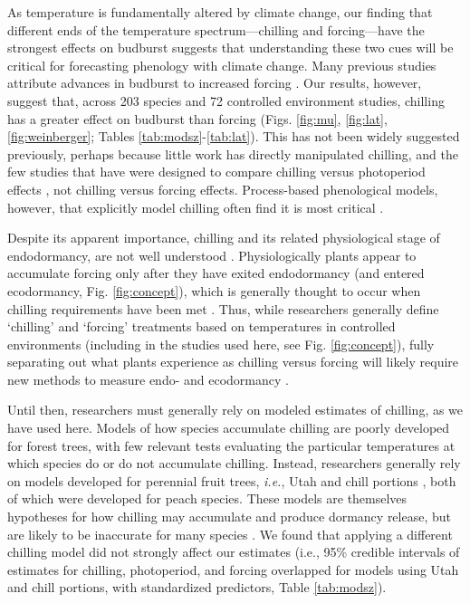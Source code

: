 \documentclass{article}
\begin{document}
\par As temperature is fundamentally altered by climate change, our finding that different ends of the temperature spectrum---chilling and forcing---have the strongest effects on budburst suggests that understanding these two cues will be critical for forecasting phenology with climate change. Many previous studies attribute advances in budburst to increased forcing \emph{\citep{menzel2006,harrington2015,Basler:2014aa,bradley1999}}. Our results, however, suggest that, across 203 species and 72 controlled environment studies, chilling has a greater effect on budburst than forcing (Figs. \ref{fig:mu}, \ref{fig:lat}, \ref{fig:weinberger}; Tables \ref{tab:modsz}-\ref{tab:lat}). This has not been widely suggested previously, perhaps because little work has directly manipulated chilling, and the few studies that have were designed to compare chilling versus photoperiod effects \emph{\citep[e.g.,][]{zohner2016,Basler:2014aa,Caffarra:2011qf,Laube:2014a}}, not chilling versus forcing effects. Process-based phenological models, however, that explicitly model chilling often find it is most critical \emph{\citep[e.g.,][]{gauzere2019}}. 
\par Despite its apparent importance, chilling and its related physiological stage of endodormancy, are not well understood \emph{\citep{chuine2016}}. Physiologically plants appear to accumulate forcing only after they have exited endodormancy (and entered ecodormancy, Fig. \ref{fig:concept}), which is generally thought to occur when chilling requirements have been met \emph{\citep{chuine2016}}. Thus, while researchers generally define `chilling' and `forcing' treatments based on temperatures in controlled environments (including in the studies used here, see Fig. \ref{fig:concept}), fully separating out what plants experience as chilling versus forcing will likely require new methods to measure endo- and ecodormancy \emph{\citep{vanderschoot2014}}. 

\par Until then, researchers must generally rely on modeled estimates of chilling, as we have used here. Models of how species accumulate chilling are poorly developed for forest trees, with few relevant tests evaluating the particular temperatures at which species do or do not accumulate chilling. Instead, researchers generally rely on models developed for perennial fruit trees, \emph{i.e.}, Utah \emph{\citep{richardson1974}} and chill portions \emph{\citep{fishman1987}}, both of which were developed for peach species. These models are themselves hypotheses for how chilling may accumulate and produce dormancy release, but are likely to be inaccurate for many species \emph{\citep{dennis2003}}. We found that applying a different chilling model did not strongly affect our estimates (i.e., 95\% credible intervals of estimates for chilling, photoperiod, and forcing overlapped for models using Utah and chill portions, with standardized predictors, Table \ref{tab:modsz}).
\end{document}
